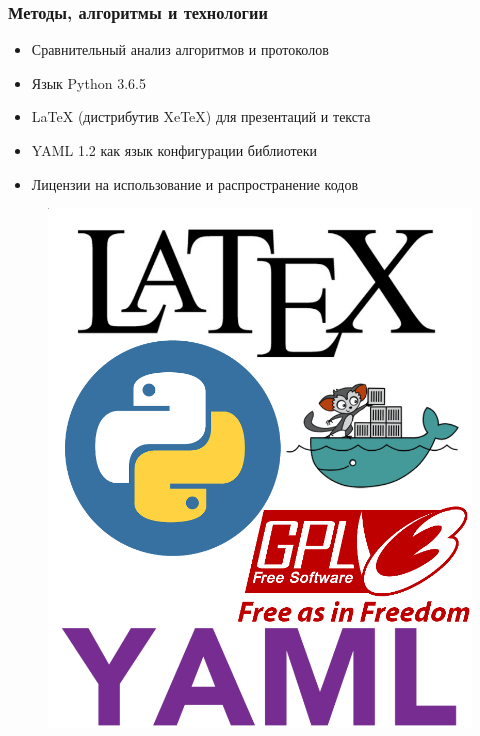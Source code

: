 \documentclass{beamer}
\begin{document}
\begin{frame}
    \frametitle{Методы, алгоритмы и технологии}
    \begin{multicols}{2}
        \begin{itemize}
            \item Сравнительный анализ алгоритмов и протоколов
            \item Язык Python 3.6.5
            \item {\LaTeX} (дистрибутив XeTeX) для презентаций и текста
            \item YAML 1.2 как язык конфигурации библиотеки
            \item Лицензии на использование и распространение кодов
        \end{itemize}
        \bigskip
        \columnbreak
        \begin{figure}
            \includegraphics[width=\columnwidth]{tech.png}
        \end{figure}
    \end{multicols}
\end{frame}
\end{document}

